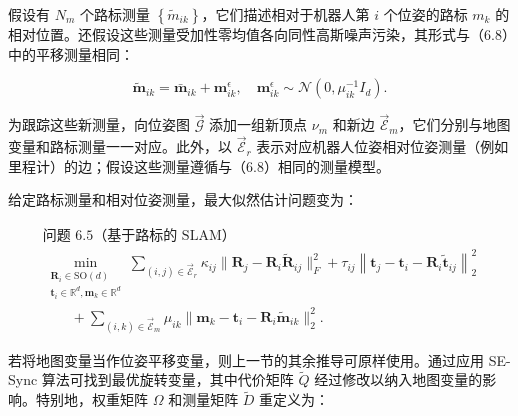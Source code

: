 假设有 $N _ { m }$ 个路标测量 $\left\{ \tilde { m } _ { i k } \right\}$，它们描述相对于机器人第 $i$ 个位姿的路标 $m_k$ 的相对位置。还假设这些测量受加性零均值各向同性高斯噪声污染，其形式与（6.8）中的平移测量相同：

\begin{equation}
\tilde {\boldsymbol {m}} _ {i k} = \bar {\boldsymbol {m}} _ {i k} + \boldsymbol {m} _ {i k} ^ {\epsilon}, \quad \boldsymbol {m} _ {i k} ^ {\epsilon} \sim \mathcal {N} \left(0, \mu_ {i k} ^ {- 1} I _ {d}\right).\tag{6.28}
\end{equation}

为跟踪这些新测量，向位姿图 $\vec { \mathcal { G } }$ 添加一组新顶点 $\nu_m$ 和新边 $\vec { \mathcal { E } }_m$，它们分别与地图变量和路标测量一一对应。此外，以 $\overrightarrow { \mathcal { E } }_r$ 表示对应机器人位姿相对位姿测量（例如里程计）的边；假设这些测量遵循与（6.8）相同的测量模型。

给定路标测量和相对位姿测量，最大似然估计问题变为：

\begin{equation}
\begin{array}{l} \text {问题 6.5（基于路标的 SLAM）} \\ \min _ {\substack {\boldsymbol {R} _ {i} \in \mathrm{SO} (d) \\ \boldsymbol {t} _ {i} \in \mathbb {R} ^ {d}, \boldsymbol {m} _ {k} \in \mathbb {R} ^ {d}}} \sum_ {(i, j) \in \overrightarrow {\mathcal {E}} _ {r}} \kappa_ {i j} \| \boldsymbol {R} _ {j} - \boldsymbol {R} _ {i} \tilde {\boldsymbol {R}} _ {i j} \| _ {F} ^ {2} + \tau_ {i j} \left\| \boldsymbol {t} _ {j} - \boldsymbol {t} _ {i} - \boldsymbol {R} _ {i} \tilde {\boldsymbol {t}} _ {i j} \right\| _ {2} ^ {2} \\ \qquad + \sum_ {(i, k) \in \vec {\mathcal {E}} _ {m}} \mu_ {i k} \| \boldsymbol {m} _ {k} - \boldsymbol {t} _ {i} - \boldsymbol {R} _ {i} \tilde {\boldsymbol {m}} _ {i k} \| _ {2} ^ {2}. \end{array}\tag{6.29}
\end{equation}

若将地图变量当作位姿平移变量，则上一节的其余推导可原样使用。通过应用 SE-Sync 算法可找到最优旋转变量，其中代价矩阵 $\tilde { Q }$ 经过修改以纳入地图变量的影响。特别地，权重矩阵 $\Omega$ 和测量矩阵 $\tilde { D }$ 重定义为：


